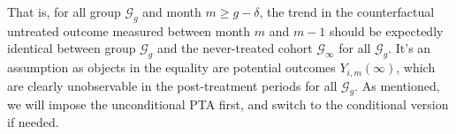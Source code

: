 That is, for all group $\mathcal{G}_g$ and month $m \geq g-\delta$, the trend in the counterfactual untreated outcome measured between month $m$ and $m-1$ should be expectedly identical between group $\mathcal{G}_g$ and the never-treated cohort $\mathcal{G}_{\infty}$ for all $\mathcal{G}_g$.
It's an assumption as objects in the equality are potential outcomes $Y_{i, m}(\infty)$, which are clearly unobservable in the post-treatment periods for all $\mathcal{G}_g$. As mentioned, we will impose the unconditional PTA first, and switch to the conditional version if needed.


